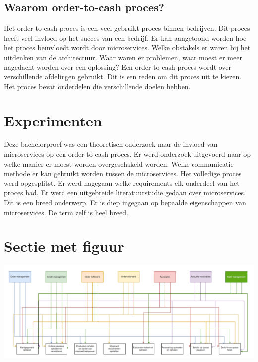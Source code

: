 \documentclass[a0,portrait]{a0poster}
\begin{document}
\begin{multicols}{2}
\subsection{Waarom order-to-cash proces?}
Het order-to-cash proces is een veel gebruikt proces binnen bedrijven. Dit proces heeft veel invloed op het succes van een bedrijf. Er kan aangetoond worden hoe het proces beïnvloedt wordt door microservices. Welke obstakels er waren bij het uitdenken van de architectuur. Waar waren er problemen, waar moest er meer nagedacht worden over een oplossing? Een order-to-cash proces wordt over verschillende afdelingen gebruikt. Dit is een reden om dit proces uit te kiezen. Het proces bevat onderdelen die verschillende doelen hebben.

\color{Black} %
\color{HoGentAccent1} 
\section*{Experimenten}
\color{black}
Deze bachelorproef was een theoretisch onderzoek naar de invloed van microservices op een order-to-cash proces. Er werd onderzoek uitgevoerd naar op welke manier er moest worden overgeschakeld worden. Welke communicatie methode er kan gebruikt worden tussen de microservices. Het volledige proces werd opgesplitst. Er werd nagegaan welke requirements elk onderdeel van het proces had. 
Er werd een uitgebreide literatuurstudie gedaan over microservices. Dit is een breed onderwerp. Er is diep ingegaan op bepaalde eigenschappen van microservices. De term zelf is heel breed.



\color{HoGentAccent1} 
\section*{Sectie met figuur}
\color{black}


\begin{center}\vspace{1cm}
\includegraphics[width=1.0\linewidth]{schema_microservices}
\end{center}\vspace{1cm}


\end{multicols}
\end{document}
